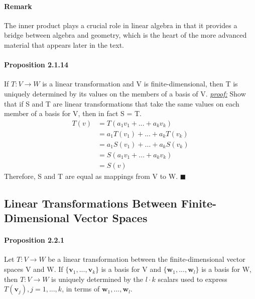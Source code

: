 \documentclass[11pt]{article}
\newcommand{\tb}[1]{\textbf{#1}}
\newcommand{\proof}[0]{\textit{\underline{proof:} }}
\newcommand{\litran}[0]{$T: V \rightarrow W$ }
\begin{document}
	\paragraph{Remark} The inner product plays a crucial role in linear algebra in that it provides a bridge between algebra and geometry, which is the heart of the more advanced material that appears later in the text.
	\paragraph{Proposition 2.1.14} If \litran is a linear transformation and V is finite-dimensional, then T is uniquely determined by its values on the members of a basis of V. \newline
	\proof Show that if S and T are linear transformations that take the same values on each member of a basis for V, then in fact S = T. \newline
	\begin{align*}
		T(v) &= T(a_1v_1 + ... + a_kv_k)\\
		&= a_1T(v_1) + ... + a_kT(v_k)\\
		&= a_1S(v_1) + ... + a_kS(v_k)\\
		&= S(a_1v_1 + ... + a_kv_k)\\
		&= S(v)
	\end{align*}
	Therefore, S and T are equal as mappings from V to W. $\blacksquare$
	\subsection{Linear Transformations Between Finite-Dimensional Vector Spaces}
	\paragraph{Proposition 2.2.1} Let \litran be a linear transformation between the finite-dimensional vector spaces V and W. If $\{\tb{v}_1,...,\tb{v}_k\}$ is a basis for V and $\{\tb{w}_1,...,\tb{w}_l\}$ is a basis for W, then \litran is uniquely determined by the $l\cdot k$ scalars used to express $T(\tb{v}_j), j = 1,...,k$, in terms of $\tb{w}_1, ..., \tb{w}_l$.
\end{document}
